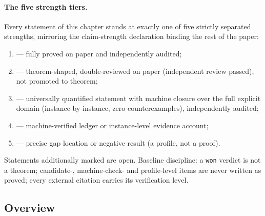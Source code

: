 \paragraph{The five strength tiers.} Every statement of this chapter stands at
exactly one of five strictly separated strengths, mirroring the claim-strength
declaration binding the rest of the paper:
\begin{enumerate}
\item \tierThm{} --- fully proved on paper and independently audited;
\item \tierPCand{} --- theorem-shaped, double-reviewed on paper (independent
review passed), not promoted to theorem;
\item \tierMUCC{} --- universally quantified statement with machine closure
over the full explicit domain (instance-by-instance, zero counterexamples),
independently audited;
\item \tierMCA{} --- machine-verified ledger or instance-level evidence
account;
\item \tierProf{} --- precise gap location or negative result (a profile, not
a proof).
\end{enumerate}
Statements additionally marked \openlab{} are open. Baseline discipline:
a \texttt{won} verdict is not a theorem; candidate-, machine-check- and
profile-level items are never written as proved; every external citation
carries its verification level.

\subsection{Overview}\label{subsec:add-overview}

